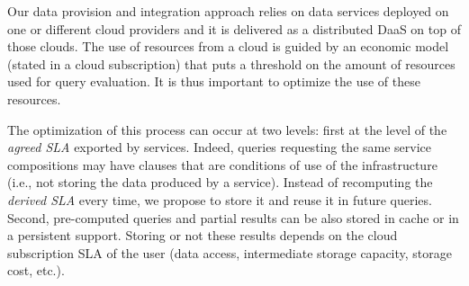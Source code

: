  Our data provision and integration approach relies on data services deployed on one or different cloud providers and it is delivered as a distributed DaaS on top of those clouds.  
The use of resources from a cloud is  guided by an economic model (stated in a cloud subscription) that puts a threshold on the amount of resources used for query evaluation. 
It is thus important to optimize the use of these resources. 
   
The optimization of this process can occur at two levels: first at the level of the {\em agreed SLA} exported by services.  
Indeed, queries requesting the same service compositions may have clauses that are conditions of use of the infrastructure (i.e., not storing the data produced by a service). 
Instead of recomputing the {\em derived SLA} every time, we propose to store it and reuse it in future queries. 
Second, pre-computed queries and partial results can be also stored in cache or in a persistent support. %
Storing or not these results depends on the cloud subscription SLA of the user (data access, intermediate storage capacity, storage cost, etc.).






 

%
 
